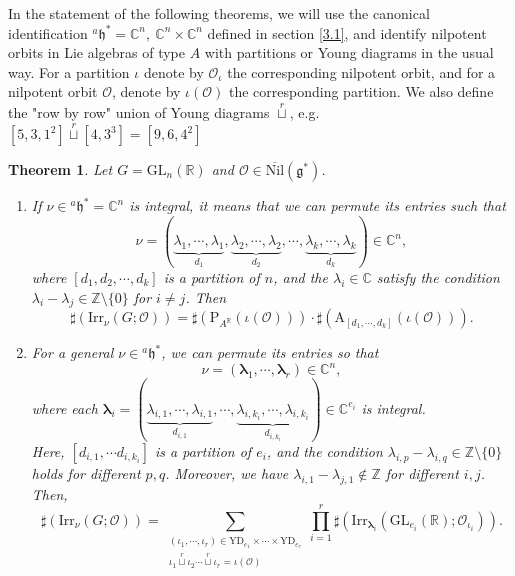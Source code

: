 \documentclass[12pt, a4paper]{amsart}
\numberwithin{equation}{section}
\newtheorem{thm}{Theorem}[section]
\newcommand{\blam}{{\boldsymbol{\lambda}}}
\newcommand{\BC}{{\mathbb {C}}}
\newcommand{\BR}{{\mathbb {R}}}
\newcommand{\BZ}{{\mathbb {Z}}}
\newcommand{\CO}{{\mathcal {O}}}
\newcommand{\RA}{{\mathrm {A}}}
\newcommand{\fg}{\mathfrak{g}}
\newcommand{\fh}{\mathfrak{h}}
\newcommand{\GL}{{\mathrm{GL}}}
\newcommand{\Irr}{{\mathrm{Irr}}}
\newcommand{\Nil}{{\mathrm{Nil}}}
\renewcommand{\bar}{\overline}
\begin{document}
In the statement of the following theorems, we will use the canonical identification $^{a}\fh^* = \BC^n, \ \BC^n \times \BC^n$ defined in section \ref{3.1}, and identify nilpotent orbits in Lie algebras of type $A$ with partitions or Young diagrams in the usual way. For a partition $\iota$ denote by $\CO_\iota$ the corresponding nilpotent orbit, and for a nilpotent orbit $\CO$, denote by $\iota(\CO)$ the corresponding partition. We also define the "row by row" union of Young diagrams $\mathop{\sqcup}\limits^r$, e.g. $[5,3,1^2] \mathop{\sqcup}\limits^r [4,3^3] = [9,6,4^2]$

\begin{thm}\label{R}
   Let $G = \GL_n(\BR)$ and $\CO \in \bar{\Nil}(\fg^*)$.
   \begin{enumerate}
        \item If $\nu \in {^{a}\fh^*} = \BC^n$ is integral, it means that we can permute its entries such that 
        \[
        \nu = (\underbrace{\lambda_1, \cdots, \lambda_1}_{d_1}, \underbrace{\lambda_2, \cdots, \lambda_2}_{d_2}, \cdots, \underbrace{\lambda_k, \cdots, \lambda_k}_{d_k}) \in \BC^n,
        \]
        where $[d_1, d_2, \cdots , d_k]$ is a partition of $n$, and the $\lambda_i \in \BC$ satisfy the condition $\lambda_i - \lambda_j \in \BZ \setminus \{0\}$ for $i \neq j$. Then
        \begin{equation}
            \sharp(\Irr_\nu(G;\CO)) = \sharp(\mathrm{P}_{A^{\BR}}(\iota(\CO)))\cdot \sharp(\RA_{[d_1,\cdots,d_k]}(\iota(\CO))).
        \end{equation}
        \item For a general $\nu \in {^{a}\fh}^*$, we can permute its entries so that 
        \[
        \nu = (\blam_1, \cdots, \blam_r) \in \BC^n,
        \]
        where each $\blam_i = (\underbrace{\lambda_{i,1}, \cdots, \lambda_{i,1}}_{d_{i,1}}, \cdots, \underbrace{\lambda_{i,k_i}, \cdots, \lambda_{i,k_i}}_{d_{i,k_i}}) \in \BC^{e_i}$ is integral.\\
        Here, $[d_{i,1}, \cdots d_{i,k_i} ]$ is a partition of $e_i$, and the condition $\lambda_{i,p} - \lambda_{i,q} \in \BZ \setminus \{0\}$ holds for different $p, q$. Moreover, we have $\lambda_{i,1} - \lambda_{j,1} \notin \BZ$ for different $i, j$. Then,
        \begin{equation}
            \sharp(\Irr_{\nu}(G;\CO)) = \sum_{\substack{(\iota_1,\cdots,\iota_r) \in \mathrm{YD}_{e_1} \times \cdots \times \mathrm{YD}_{e_r} \\ \iota_1 \mathop{\sqcup}\limits^r \iota_2 \cdots \mathop{\sqcup}\limits^r  \iota_r = \iota(\CO) }}\prod_{i=1}^{r}\sharp(\Irr_{\blam_i}(\GL_{e_i}(\BR);\CO_{\iota_i})).
        \end{equation}
    \end{enumerate}
\end{thm}
\end{document}
